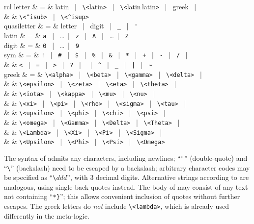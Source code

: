 \begin{isabellebody}
\begin{isamarkuptext}
\begin{matharray}{rcl}
    letter & = & latin ~|~ \verb,\,\verb,<,latin\verb,>, ~|~ \verb,\,\verb,<,latin\,latin\verb,>, ~|~ greek ~|~ \\
           &   & \verb,\<^isub>, ~|~ \verb,\<^isup>, \\
    quasiletter & = & letter ~|~ digit ~|~ \verb,_, ~|~ \verb,', \\
    latin & = & \verb,a, ~|~ \dots ~|~ \verb,z, ~|~ \verb,A, ~|~ \dots ~|~ \verb,Z, \\
    digit & = & \verb,0, ~|~ \dots ~|~ \verb,9, \\
    sym & = & \verb,!, ~|~ \verb,#, ~|~ \verb,$, ~|~ \verb,%, ~|~ \verb,&, ~|~
     \verb,*, ~|~ \verb,+, ~|~ \verb,-, ~|~ \verb,/, ~|~ \\
    & & \verb,<, ~|~ \verb,=, ~|~ \verb,>, ~|~ \verb,?, ~|~ \texttt{\at} ~|~
    \verb,^, ~|~ \verb,_, ~|~ \verb,|, ~|~ \verb,~, \\
    greek & = & \verb,\<alpha>, ~|~ \verb,\<beta>, ~|~ \verb,\<gamma>, ~|~ \verb,\<delta>, ~| \\
          &   & \verb,\<epsilon>, ~|~ \verb,\<zeta>, ~|~ \verb,\<eta>, ~|~ \verb,\<theta>, ~| \\
          &   & \verb,\<iota>, ~|~ \verb,\<kappa>, ~|~ \verb,\<mu>, ~|~ \verb,\<nu>, ~| \\
          &   & \verb,\<xi>, ~|~ \verb,\<pi>, ~|~ \verb,\<rho>, ~|~ \verb,\<sigma>, ~|~ \verb,\<tau>, ~| \\
          &   & \verb,\<upsilon>, ~|~ \verb,\<phi>, ~|~ \verb,\<chi>, ~|~ \verb,\<psi>, ~| \\
          &   & \verb,\<omega>, ~|~ \verb,\<Gamma>, ~|~ \verb,\<Delta>, ~|~ \verb,\<Theta>, ~| \\
          &   & \verb,\<Lambda>, ~|~ \verb,\<Xi>, ~|~ \verb,\<Pi>, ~|~ \verb,\<Sigma>, ~| \\
          &   & \verb,\<Upsilon>, ~|~ \verb,\<Phi>, ~|~ \verb,\<Psi>, ~|~ \verb,\<Omega>, \\
  \end{matharray}

  The syntax of  admits any characters, including
  newlines; ``\verb|"|'' (double-quote) and ``\verb|\|'' (backslash)
  need to be escaped by a backslash; arbitrary character codes may be
  specified as ``\verb|\|$ddd$'', with 3 decimal digits.  Alternative
  strings according to  are analogous, using single
  back-quotes instead.  The body of  may consist of
  any text not containing ``\verb,*,\verb,},''; this allows convenient
  inclusion of quotes without further escapes.  The greek letters do
  \emph{not} include \verb,\<lambda>,, which is already used differently in
  the meta-logic.


\end{isamarkuptext}
\end{isabellebody}
